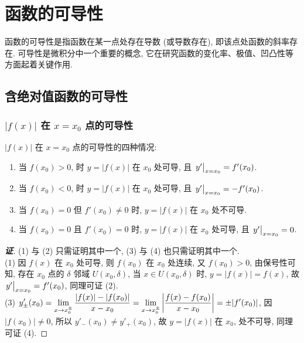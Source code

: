 \section{函数的可导性}

函数的可导性是指函数在某一点处存在导数 (或导数存在), 即该点处函数的斜率存在. 
可导性是微积分中一个重要的概念, 它在研究函数的变化率、极值、凹凸性等方面起着关键作用.

\subsection{含绝对值函数的可导性}

\subsubsection{\texorpdfstring{$|f(x)|$}. 在 \texorpdfstring{$x=x_0$}. 点的可导性}

\begin{theorem}[含绝对值函数的可导性]
    $ |f(x)| $ 在 $x=x_0$ 点的可导性的四种情况:\label{thereAreFourCasesOfDerivability}
    \begin{enumerate}[label=(\arabic{*})]
        \item 当 $f(x_0)>0$, 时 $y=|f(x)|$ 在 $x_0$ 处可导, 且 $\eval{y'}_{x=x_0}=f'(x_0)$.
        \item 当 $f(x_0)<0$, 时 $y=|f(x)|$ 在 $x_0$ 处可导, 且 $\eval{y'}_{x=x_0}=-f'(x_0)$.
        \item 当 $f(x_0)=0$ 但 $f'(x_0)\neq0$ 时, $y=|f(x)|$ 在 $x_0$ 处不可导.
        \item 当 $f(x_0)=0$ 且 $f'(x_0)=0$ 时, $y=|f(x)|$ 在 $x_0$ 处可导, 且 $\eval{y'}_{x=x_0}=0$.
    \end{enumerate}
\end{theorem}
\begin{proof}[{\songti \textbf{证}}]
    (1) 与 (2) 只需证明其中一个, (3) 与 (4) 也只需证明其中一个.\\
    (1) 因 $f(x)$ 在 $x_0$ 处可导, 则 $f(x_0)$ 在 $x_0$ 处连续, 又 $f(x_0)>0$, 由保号性可知, 存在 $x_0$ 点的 $\delta$ 邻域 $U(x_0,\delta)$, 
    当 $x\in U(x_0,\delta)$ 时, $y=|f(x)|=f(x)$, 故 $\eval{y'}_{x=x_0}=f'(x_0)$, 同理可证 (2).\\
    (3) $\displaystyle y'_{\pm}(x_0)=\lim_{x\to x_0^{\pm}}\dfrac{|f(x)|-|f(x_0)|}{x-x_0}=\lim_{x\to x_0^{\pm}}\qty|\dfrac{f(x)-f(x_0)}{x-x_0}|=\pm|f'(x_0)|$, 
    因 $|f(x_0)|\neq0$, 所以 $y'_-(x_0)\neq y'_+(x_0)$, 故 $y=|f(x)|$ 在 $x_0$, 处不可导, 同理可证 (4).
\end{proof}

